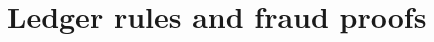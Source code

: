 \documentclass[../midgard.tex]{subfiles}
\begin{document}
\chapter{Ledger rules and fraud proofs}
\label{h:ledger-rules-and-fraud-proofs}
\end{document}
